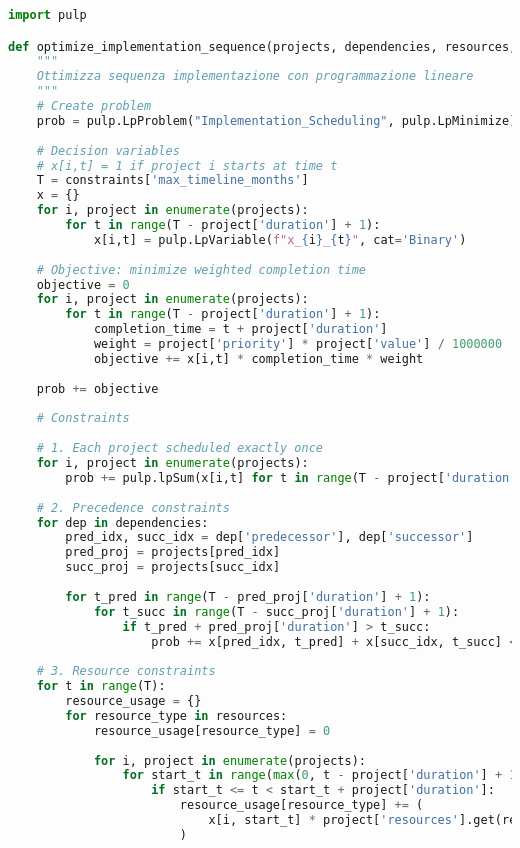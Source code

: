 \begin{lstlisting}[language=Python, caption=Algoritmo di Scheduling con Vincoli]
import pulp

def optimize_implementation_sequence(projects, dependencies, resources, constraints):
    """
    Ottimizza sequenza implementazione con programmazione lineare
    """
    # Create problem
    prob = pulp.LpProblem("Implementation_Scheduling", pulp.LpMinimize)
    
    # Decision variables
    # x[i,t] = 1 if project i starts at time t
    T = constraints['max_timeline_months']
    x = {}
    for i, project in enumerate(projects):
        for t in range(T - project['duration'] + 1):
            x[i,t] = pulp.LpVariable(f"x_{i}_{t}", cat='Binary')
    
    # Objective: minimize weighted completion time
    objective = 0
    for i, project in enumerate(projects):
        for t in range(T - project['duration'] + 1):
            completion_time = t + project['duration']
            weight = project['priority'] * project['value'] / 1000000
            objective += x[i,t] * completion_time * weight
    
    prob += objective
    
    # Constraints
    
    # 1. Each project scheduled exactly once
    for i, project in enumerate(projects):
        prob += pulp.lpSum(x[i,t] for t in range(T - project['duration'] + 1)) == 1
    
    # 2. Precedence constraints
    for dep in dependencies:
        pred_idx, succ_idx = dep['predecessor'], dep['successor']
        pred_proj = projects[pred_idx]
        succ_proj = projects[succ_idx]
        
        for t_pred in range(T - pred_proj['duration'] + 1):
            for t_succ in range(T - succ_proj['duration'] + 1):
                if t_pred + pred_proj['duration'] > t_succ:
                    prob += x[pred_idx, t_pred] + x[succ_idx, t_succ] <= 1
    
    # 3. Resource constraints
    for t in range(T):
        resource_usage = {}
        for resource_type in resources:
            resource_usage[resource_type] = 0
            
            for i, project in enumerate(projects):
                for start_t in range(max(0, t - project['duration'] + 1), min(t + 1, T - project['duration'] + 1)):
                    if start_t <= t < start_t + project['duration']:
                        resource_usage[resource_type] += (
                            x[i, start_t] * project['resources'].get(resource_type, 0)
                        )
            

\end{lstlisting}
